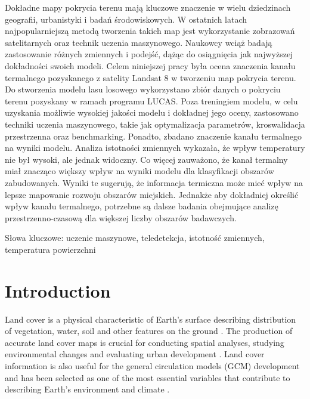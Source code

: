 \documentclass{amuthesis}
\begin{document}
Dokładne mapy pokrycia terenu mają kluczowe znaczenie w wielu
dziedzinach geografii, urbanistyki i badań środowiskowych. W ostatnich
latach najpopularniejszą metodą tworzenia takich map jest wykorzystanie
zobrazowań satelitarnych oraz technik uczenia maszynowego. Naukowcy
wciąż badają zastosowanie różnych zmiennych i podejść, dążąc do
osiągnięcia jak najwyższej dokładności swoich modeli. Celem niniejszej
pracy była ocena znaczenia kanału termalnego pozyskanego z satelity
Landsat 8 w tworzeniu map pokrycia terenu. Do stworzenia modelu lasu
losowego wykorzystano zbiór danych o pokryciu terenu pozyskany w ramach
programu LUCAS. Poza treningiem modelu, w celu uzyskania możliwie
wysokiej jakości modelu i dokładnej jego oceny, zastosowano techniki
uczenia maszynowego, takie jak optymalizacja parametrów, kroswalidacja
przestrzenna oraz benchmarking. Ponadto, zbadano znaczenie kanału
termalnego na wyniki modelu. Analiza istotności zmiennych wykazała, że
wpływ temperatury nie był wysoki, ale jednak widoczny. Co więcej
zauważono, że kanał termalny miał znacząco większy wpływ na wyniki
modelu dla klasyfikacji obszarów zabudowanych. Wyniki te sugerują, że
informacja termiczna może mieć wpływ na lepsze mapowanie rozwoju
obszarów miejskich. Jednakże aby dokładniej określić wpływ kanału
termalnego, potrzebne są dalsze badania obejmujące analizę
przestrzenno-czasową dla większej liczby obszarów badawczych.

Słowa kluczowe: uczenie maszynowe, teledetekcja, istotność zmiennych,
temperatura powierzchni

\newpage

\sf\tighttoc\doublespacing


\hypertarget{sec-intro}{%
\chapter{Introduction}\label{sec-intro}}

Land cover is a physical characteristic of Earth's surface describing
distribution of vegetation, water, soil and other features on the ground
\autocite{rawat_monitoring_2015}. The production of accurate land cover
maps is crucial for conducting spatial analyses, studying environmental
changes \autocite{reis_analyzing_2008} and evaluating urban development
\autocite{hashem_change_2015}. Land cover information is also useful for
the general circulation models (GCM) development
\autocite{running_ecosystem_2008} and has been selected as one of the
most essential variables that contribute to describing Earth's
environment and climate \autocite{bojinski_concept_2014}.
\end{document}
